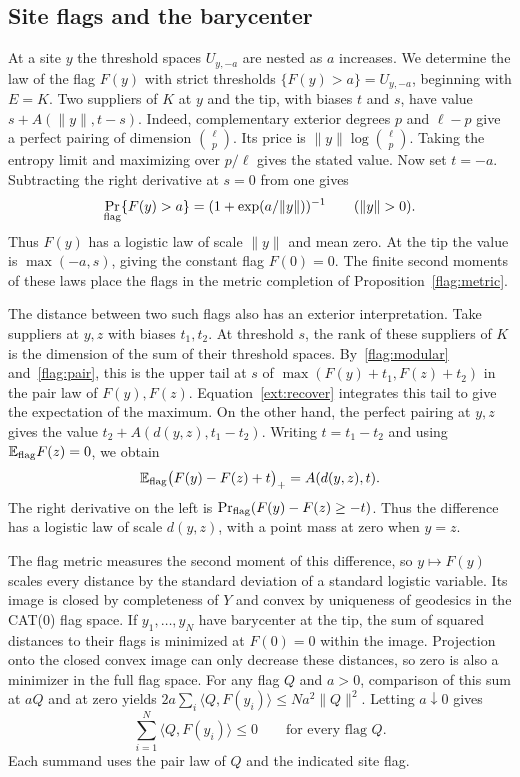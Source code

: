 \subsection{Site flags and the barycenter}

At a site $y$ the threshold spaces $U_{y,-a}$ are nested as $a$
increases. We determine the law of the flag $F(y)$ with strict
thresholds $\{F(y)>a\}=U_{y,-a}$, beginning with $E=K$.
Two suppliers of $K$ at $y$ and the tip, with biases $t$ and $s$,
have value $s+A(\|y\|,t-s)$. Indeed, complementary exterior degrees
$p$ and $\ell-p$ give a perfect pairing of dimension $\binom{\ell}{p}$.
Its price is $\|y\|\log\binom{\ell}{p}$. Taking the entropy limit
and maximizing over $p/\ell$ gives the stated value. Now set $t=-a$.
Subtracting the right derivative at $s=0$ from one gives
\[
 \Pr_{\rm flag}\{F(y)>a\}=(1+\exp(a/\|y\|))^{-1}
 \qquad (\|y\|>0).
\]
Thus $F(y)$ has a logistic law of scale $\|y\|$ and mean zero.
At the tip the value is $\max(-a,s)$, giving the constant flag $F(0)=0$.
The finite second moments of these laws place the flags in the metric
completion of Proposition~\ref{flag:metric}.

The distance between two such flags also has an exterior interpretation.
Take suppliers at $y,z$ with biases $t_1,t_2$. At threshold $s$,
the rank of these suppliers of $K$ is the dimension of the sum of
their threshold spaces. By~\eqref{flag:modular} and~\eqref{flag:pair},
this is the upper tail at $s$ of $\max(F(y)+t_1,F(z)+t_2)$ in the
pair law of $F(y),F(z)$. Equation~\eqref{ext:recover} integrates this
tail to give the expectation of the maximum. On the other hand, the
perfect pairing at $y,z$ gives the value $t_2+A(d(y,z),t_1-t_2)$.
Writing $t=t_1-t_2$ and using $\mathbb E_{\rm flag}F(z)=0$, we obtain
\[
 \mathbb E_{\rm flag}\big(F(y)-F(z)+t\big)_+=A(d(y,z),t).
\]
The right derivative on the left is
$\Pr_{\rm flag}(F(y)-F(z)\ge-t)$. Thus the difference has a logistic
law of scale $d(y,z)$, with a point mass at zero when $y=z$.

The flag metric measures the second moment of this difference, so
$y\mapsto F(y)$ scales every distance by the standard deviation of a
standard logistic variable. Its image is closed by completeness of $Y$
and convex by uniqueness of geodesics in the CAT(0) flag space.
If $y_1,\ldots,y_N$ have barycenter at the tip, the sum of squared
distances to their flags is minimized at $F(0)=0$ within the image.
Projection onto the closed convex image can only decrease these
distances, so zero is also a minimizer in the full flag space.
For any flag $Q$ and $a>0$, comparison of this sum at $aQ$ and at
zero yields
$2a\sum_i\langle Q,F(y_i)\rangle\le Na^2\|Q\|^2$. Letting
$a\downarrow0$ gives
\begin{equation}\label{ext:center}
 \sum_{i=1}^N \langle Q,F(y_i)\rangle\le0
 \qquad\text{for every flag }Q .
\end{equation}
Each summand uses the pair law of $Q$ and the indicated site flag.

